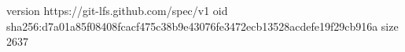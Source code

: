 version https://git-lfs.github.com/spec/v1
oid sha256:d7a01a85f08408fcacf475c38b9e43076fe3472ecb13528acdefe19f29cb916a
size 2637
